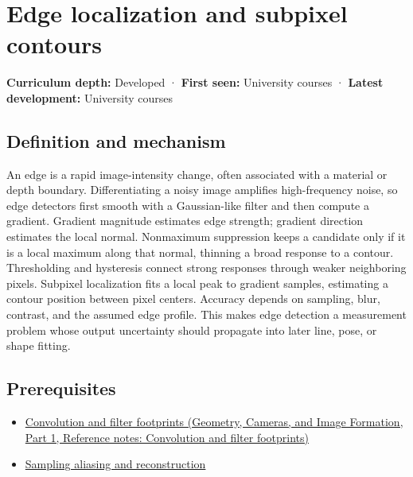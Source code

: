 \hypertarget{appendix-36022286b03e}{}\label{referencestart:appendix-36022286b03e}
\section{Edge localization and subpixel contours}\label{appendix-36022286b03e-edge-localization-and-subpixel-contours}

\hypertarget{appendix-36022286b03e-edge-localization-and-subpixel-contours}{}

\textbf{Curriculum depth:} Developed · \textbf{First seen:} University courses · \textbf{Latest development:} University courses

\begin{allmightroledefinition}

\subsection{Definition and mechanism}\label{appendix-36022286b03e-definition-and-mechanism}

\hypertarget{appendix-36022286b03e-definition-and-mechanism}{}

An edge is a rapid image-intensity change, often associated with a material or depth boundary. Differentiating a noisy image amplifies high-frequency noise, so edge detectors first smooth with a Gaussian-like filter and then compute a gradient. Gradient magnitude estimates edge strength; gradient direction estimates the local normal. Nonmaximum suppression keeps a candidate only if it is a local maximum along that normal, thinning a broad response to a contour. Thresholding and hysteresis connect strong responses through weaker neighboring pixels. Subpixel localization fits a local peak to gradient samples, estimating a contour position between pixel centers. Accuracy depends on sampling, blur, contrast, and the assumed edge profile. This makes edge detection a measurement problem whose output uncertainty should propagate into later line, pose, or shape fitting.

\end{allmightroledefinition}

\subsection{Prerequisites}\label{appendix-36022286b03e-prerequisites}

\hypertarget{appendix-36022286b03e-prerequisites}{}

\begin{itemize}
\tightlist
\item
  \href{../03-Geometry-Cameras-and-Image-Formation-P01/main.pdf\#appendix-d5b3c692d9f0}{Convolution and filter footprints (Geometry, Cameras, and Image Formation, Part 1, Reference notes: Convolution and filter footprints)}
\item
  \hyperref[appendix-6a7869dd79a6]{Sampling aliasing and reconstruction}
\end{itemize}


